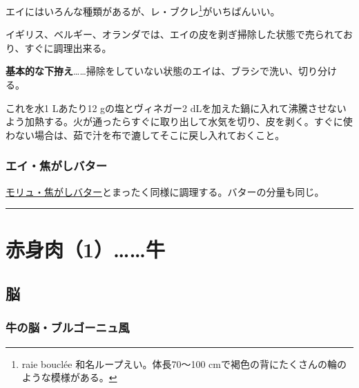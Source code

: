 \begin{Main}
エイにはいろんな種類があるが、レ・ブクレ\footnote{raie bouclée
  和名ループえい。体長70〜100
  cmで褐色の背にたくさんの輪のような模様がある。}がいちばんいい。

イギリス、ベルギー、オランダでは、エイの皮を剥ぎ掃除した状態で売られており、すぐに調理出来る。

\textbf{基本的な下拵え}\ldots{}\ldots{}掃除をしていない状態のエイは、ブラシで洗い、切り分ける。

これを水1 Lあたり12 gの塩とヴィネガー2
dLを加えた鍋に入れて沸騰させないよう加熱する。火が通ったらすぐに取り出して水気を切り、皮を剥く。すぐに使わない場合は、茹で汁を布で漉してそこに戻し入れておくこと。

\hypertarget{raie-au-beurre-noir-ou-au-beurre-noisette}{%
\subsubsection{エイ・焦がしバター}\label{raie-au-beurre-noir-ou-au-beurre-noisette}}

\protect\hyperlink{morue-au-beurre-noir-ou-au-beurre-noisette}{モリュ・焦がしバター}とまったく同様に調理する。バターの分量も同じ。

\begin{center}\rule{0.5\linewidth}{\linethickness}\end{center}

\hypertarget{boeuf}{%
\section{赤身肉（1）\ldots{}\ldots{}牛}\label{boeuf}}


 

\hypertarget{cervelles}{%
\subsection{脳}\label{cervelles}}


\hypertarget{cervelle-a-la-bourguignonne}{%
\subsubsection{牛の脳・ブルゴーニュ風}\label{cervelle-a-la-bourguignonne}}




\end{Main}
